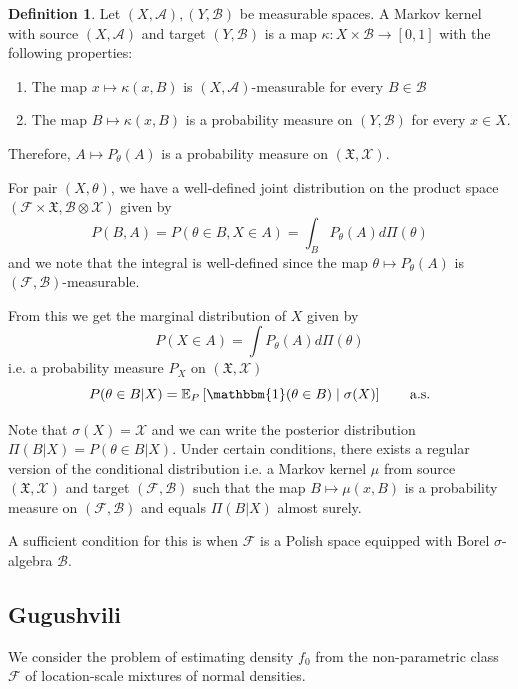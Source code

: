 \documentclass[a4paper,11pt]{article}
\theoremstyle{theorem}
\theoremstyle{definition}
\newtheorem{defn}{Definition}[section]
\providecommand{\E}{\mathbb{E}}
\begin{document}
\begin{defn}
Let $(X, \mathcal{A}), (Y, \mathcal{B})$ be measurable spaces. A Markov kernel with source $(X, \mathcal{A})$ and target $(Y, \mathcal{B})$ is a map $\kappa : X \times \mathcal{B} \to [0, 1]$ with the following properties:
\begin{enumerate}
\item The map $x \mapsto \kappa(x, B)$ is $(X, \mathcal{A})$-measurable for every $B \in \mathcal{B}$
\item The map $B \mapsto \kappa(x, B)$ is a probability measure on $(Y, \mathcal{B})$ for every $x \in X$.
\end{enumerate} 
\end{defn}

Therefore, $A \mapsto P_{\theta}(A)$ is a probability measure on $(\mathfrak{X}, \mathcal{X})$.

For pair $(X, \theta)$, we have a well-defined joint distribution on the product space $(\mathcal{F} \times \mathfrak{X}, \mathcal{B} \otimes \mathcal{X})$ given by
\[
P(B, A) = P(\theta \in B, X \in A) = \int_{B}{P_{\theta}(A)d\Pi(\theta)}
\]   
and we note that the integral is well-defined since the map $\theta \mapsto P_{\theta}(A)$ is $(\mathcal{F}, \mathcal{B})$-measurable.

From this we get the marginal distribution of $X$ given by
\[
P(X \in A) = \int{P_{\theta}(A)d\Pi(\theta)}
\]
i.e. a probability measure $P_{X}$ on $(\mathfrak{X}, \mathcal{X})$
\[
P(\theta \in B | X) = \E_{P} \left[ \mathbbm{1}(\theta \in B) \;|\; \sigma(X) \right] \qquad \text{a.s.}
\]

Note that $\sigma(X) = \mathcal{X}$ and we can write the posterior distribution $\Pi(B|X) = P(\theta \in B | X)$. Under certain conditions, there exists a regular version of the conditional distribution i.e. a Markov kernel $\mu$ from source $(\mathfrak{X}, \mathcal{X})$ and target $(\mathcal{F}, \mathcal{B})$ such that the map $B \mapsto \mu(x, B)$ is a probability measure on $(\mathcal{F}, \mathcal{B})$ and equals $\Pi(B|X)$ almost surely.   

A sufficient condition for this is when $\mathcal{F}$ is a Polish space equipped with Borel $\sigma$-algebra $\mathcal{B}$.


 
\subsection{Gugushvili}

We consider the problem of estimating density $f_{0}$ from the non-parametric class $\mathcal{F}$ of location-scale mixtures of normal densities.
\end{document}
